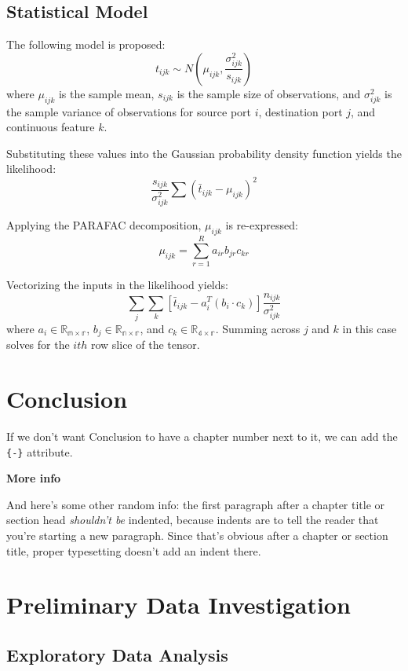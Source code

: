 \documentclass[12pt,twoside]{dukestatscithesis}
\theoremstyle{definition}
\theoremstyle{definition}
\theoremstyle{definition}
\theoremstyle{remark}
\begin{document}
\section{Statistical Model}\label{statistical-model}

The following model is proposed:
\[t_{ijk} \sim N(\mu_{ijk}, \frac{\sigma^2_{ijk}}{s_{ijk}})\] where
\(\mu_{ijk}\) is the sample mean, \(s_{ijk}\) is the sample size of
observations, and \(\sigma^2_{ijk}\) is the sample variance of
observations for source port \(i\), destination port \(j\), and
continuous feature \(k\).

Substituting these values into the Gaussian probability density function
yields the likelihood:
\[\frac{s_{ijk}}{\sigma^2_{ijk}}\sum(\bar t_{ijk} - \mu_{ijk})^2\]

Applying the PARAFAC decomposition, \(\mu_{ijk}\) is re-expressed:
\[\mu_{ijk} = \sum_{r=1}^Ra_{ir}b_{jr}c_{kr}\]

Vectorizing the inputs in the likelihood yields:
\[\sum_j\sum_k[\bar t_{ijk} - a_i^T(b_i \cdotp c_k)]\frac{n_{ijk}}{\sigma^2_{ijk}}\]
where \(a_i \in \mathbb{R_{m \times r}}\),
\(b_j \in \mathbb{R_{n \times r}}\), and
\(c_k \in \mathbb{R_{4 \times r}}\). Summing across \(j\) and \(k\) in
this case solves for the \(ith\) row slice of the tensor.

\chapter*{Conclusion}\label{conclusion}

If we don't want Conclusion to have a chapter number next to it, we can
add the \texttt{\{-\}} attribute.

\textbf{More info}

And here's some other random info: the first paragraph after a chapter
title or section head \emph{shouldn't be} indented, because indents are
to tell the reader that you're starting a new paragraph. Since that's
obvious after a chapter or section title, proper typesetting doesn't add
an indent there.

\appendix

\chapter{Preliminary Data
Investigation}\label{preliminary-data-investigation}

\section{Exploratory Data Analysis}\label{exploratory-data-analysis}
\end{document}
